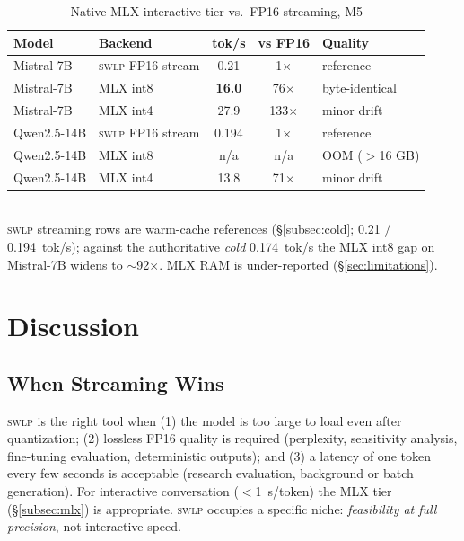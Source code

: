 \documentclass[10pt,a4paper]{article}
\newcommand{\swlp}{\textsc{swlp}}
\begin{document}
\begin{table}[htbp]
\centering
\caption{Native MLX interactive tier vs.\ FP16 streaming, M5}
\label{tab:mlx}
\begin{tabular}{@{}llccl@{}}
\toprule
\textbf{Model} & \textbf{Backend} & \textbf{tok/s} & \textbf{vs FP16} & \textbf{Quality} \\
\midrule
Mistral-7B & \swlp{} FP16 stream & 0.21 & 1$\times$ & reference \\
Mistral-7B & MLX int8 & \textbf{16.0} & 76$\times$ & byte-identical \\
Mistral-7B & MLX int4 & 27.9 & 133$\times$ & minor drift \\
Qwen2.5-14B & \swlp{} FP16 stream & 0.194 & 1$\times$ & reference \\
Qwen2.5-14B & MLX int8 & n/a & n/a & OOM ($>$16 GB) \\
Qwen2.5-14B & MLX int4 & 13.8 & 71$\times$ & minor drift \\
\bottomrule
\end{tabular}
\\[0.3em]
{\small \swlp{} streaming rows are warm-cache references (\S\ref{subsec:cold};
0.21 / 0.194~tok/s); against the authoritative \emph{cold} 0.174~tok/s the MLX
int8 gap on Mistral-7B widens to $\sim$92$\times$. MLX RAM is under-reported
(\S\ref{sec:limitations}).}
\end{table}

\section{Discussion}
\label{sec:discussion}

\subsection{When Streaming Wins}
\label{subsec:when}
\swlp{} is the right tool when (1) the model is too large to load even after
quantization; (2) lossless FP16 quality is required (perplexity, sensitivity
analysis, fine-tuning evaluation, deterministic outputs); and (3) a latency of one
token every few seconds is acceptable (research evaluation, background or batch
generation). For interactive conversation ($<$1~s/token) the MLX tier
(\S\ref{subsec:mlx}) is appropriate. \swlp{} occupies a specific niche:
\emph{feasibility at full precision}, not interactive speed.
\end{document}
